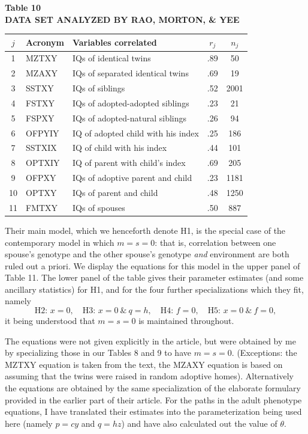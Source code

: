﻿\documentclass[12pt]{article}
\begin{document}
\begin{center}
\textbf{Table 10}\\
\textbf{DATA SET ANALYZED BY RAO, MORTON, \& YEE}
\end{center}
\begin{center}
\begin{tabular}{c l l c c}
\hline
$j$ & Acronym & Variables correlated & $r_j$ & $n_j$ \\
\hline
1 & MZTXY & IQs of identical twins & .89 & 50 \\
2 & MZAXY & IQs of separated identical twins & .69 & 19 \\
3 & SSTXY & IQs of siblings & .52 & 2001 \\
4 & FSTXY & IQs of adopted-adopted siblings & .23 & 21 \\
5 & FSPXY & IQs of adopted-natural siblings & .26 & 94 \\
6 & OFPYIY & IQ of adopted child with his index & .25 & 186 \\
7 & SSTXIX & IQ of child with his index & .44 & 101 \\
8 & OPTXIY & IQ of parent with child's index & .69 & 205 \\
9 & OFPXY & IQs of adoptive parent and child & .23 & 1181 \\
10 & OPTXY & IQs of parent and child & .48 & 1250 \\
11 & FMTXY & IQs of spouses & .50 & 887 \\
\hline
\end{tabular}
\end{center}

Their main model, which we henceforth denote H1, is the special case of the contemporary model in which $m=s=0$: that is, correlation between one spouse's genotype and the other spouse's genotype \emph{and} environment are both ruled out a priori. We display the equations for this model in the upper panel of Table 11. The lower panel of the table gives their parameter estimates (and some ancillary statistics) for H1, and for the four further specializations which they fit, namely
\begin{equation*}
\text{H2: } x=0, \quad \text{H3: } x=0 \ \& \ q=h, \quad \text{H4: } f=0, \quad \text{H5: } x=0 \ \& \ f=0,
\end{equation*}
it being understood that $m=s=0$ is maintained throughout.

The equations were not given explicitly in the article, but were obtained by me by specializing those in our Tables 8 and 9 to have $m=s=0$. (Exceptions: the MZTXY equation is taken from the text, the MZAXY equation is based on assuming that the twins were raised in random adoptive homes). Alternatively the equations are obtained by the same specialization of the elaborate formulary provided in the earlier part of their article. For the paths in the adult phenotype equations, I have translated their estimates into the parameterization being used here (namely $p=cy$ and $q=hz$) and have also calculated out the value of $\theta$.
\end{document}
